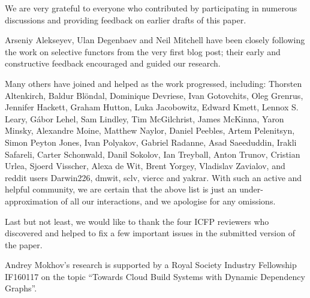 \documentclass[acmsmall,screen]{acmart}
\newcommand{\cmd}[1]{\textsf{\color[rgb]{0,0,0.5} #1}}
\begin{document}

\maketitle










\begin{acks}
  We are very grateful to everyone who contributed by participating in numerous
  discussions and providing feedback on earlier drafts of this paper.

  Arseniy Alekseyev, Ulan Degenbaev and Neil Mitchell have been closely
  following the work on selective functors from the very first blog post; their
  early and constructive feedback encouraged and guided our research.

  Many others have joined and helped as the work progressed, including:
  Thorsten Altenkirch, \mbox{Baldur} Bl{\"o}ndal, Dominique Devriese,
  Ivan Gotovchits, Oleg Grenrus, Jennifer Hackett, Graham Hutton,
  Luka Jacobowitz, Edward Kmett, Lennox S. Leary, G\'abor Lehel, Sam Lindley,
  Tim McGilchrist, James McKinna, Yaron Minsky, Alexandre Moine, Matthew Naylor,
  Daniel Peebles, Artem Pelenitsyn, Simon Peyton Jones, Ivan Polyakov,
  Gabriel Radanne, Asad Saeeduddin, Irakli Safareli, Carter Schonwald,
  Danil Sokolov, Ian Treyball, Anton Trunov, Cristian Urlea, Sjoerd Visscher,
  Alexa de Wit, Brent Yorgey, Vladislav Zavialov, and reddit users
  \cmd{Darwin226}, \cmd{dmwit}, \cmd{sclv}, \cmd{viercc} and \cmd{yakrar}. With
  such an active and helpful community, we are certain that the above list is
  just an under-approximation of all our interactions, and we apologise for any
  omissions.

  Last but not least, we would like to thank the four ICFP reviewers who
  discovered and helped to fix a few important issues in the submitted version
  of the paper.

  Andrey Mokhov's research is supported by a Royal Society Industry Fellowship
  \cmd{IF160117} on the topic ``Towards Cloud Build Systems with Dynamic
  Dependency Graphs''.
\end{acks}

\newpage

\end{document}
